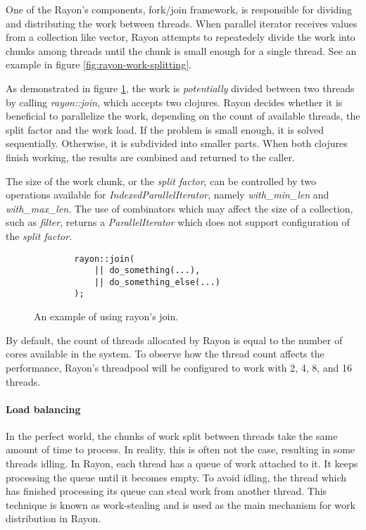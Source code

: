 One of the Rayon's components, fork/join framework, is responsible for dividing and distributing the work between threads. When parallel iterator receives values from a collection like vector, Rayon attempts to repeatedely divide the work into chunks among threads until the chunk is small enough for a single thread. See an example in figure \ref{fig:rayon-work-splitting}.

As demonstrated in figure \ref{fig:rayon-join}, the work is \emph{potentially} divided between two threads by calling \emph{rayon::join}, which accepts two clojures. Rayon decides whether it is beneficial to parallelize the work, depending on the count of available threads, the split factor and the work load. If the problem is small enough, it is solved sequentially. Otherwise, it is subdivided into smaller parts. When both clojures finish working, the results are combined and returned to the caller. 

The size of the work chunk, or the \emph{split factor}, can be controlled by two operations available for \emph{IndexedParallelIterator}, namely \emph{with\_min\_len} and \emph{with\_max\_len}. The use of combinators which may affect the size of a collection, such as \emph{filter}, returns a \emph{ParallelIterator} which does not support configuration of the \emph{split factor}. 

\begin{figure}[!htbp]
    \centering

    \begin{verbatim}
        rayon::join(
            || do_something(...),
            || do_something_else(...)
        );
    \end{verbatim}
    
    \caption{An example of using rayon's join.}
    \label{fig:rayon-join}
\end{figure}

By default, the count of threads allocated by Rayon is equal to the number of cores available in the system. To observe how the thread count affects the performance, Rayon's threadpool will be configured to work with 2, 4, 8, and 16 threads. 

\paragraph*{Load balancing}
In the perfect world, the chunks of work split between threads take the same amount of time to process. In reality, this is often not the case, resulting in some threads idling. In Rayon, each thread has a queue of work attached to it. It keeps processing the queue until it becomes empty. To avoid idling, the thread which has finished processing its queue can steal work from another thread. This technique is known as work-stealing and is used as the main mechanism for work distribution in Rayon. 

